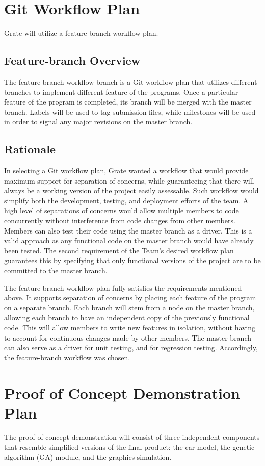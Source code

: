 \documentclass{article}
\begin{document}
\section{Git Workflow Plan}
Grate will utilize a feature-branch workflow plan. 

\subsection{Feature-branch Overview}
The feature-branch workflow branch is a Git workflow plan that utilizes 
different branches to implement different feature of the programs. Once a 
particular feature of the program is completed, its branch will be merged with 
the master branch. Labels will be used to tag submission files, while milestones 
will be used in order to signal any major revisions on the master branch.

\subsection{Rationale}
In selecting a Git workflow plan, Grate wanted a workflow that would provide 
maximum support for separation of concerns, while guaranteeing that there will 
always be a working version of the project easily assessable. Such workflow 
would simplify both the development, testing, and deployment efforts of the 
team. A high level of separations of concerns would allow multiple members to 
code concurrently without interference from code changes from other members. 
Members can also test their code using the master branch as a driver. This is a 
valid approach as any functional code on the master branch would have already 
been tested. The second requirement of the Team's desired workflow plan 
guarantees this by specifying that only functional versions of the project are 
to be committed to the master branch. 

The feature-branch workflow plan fully satisfies the requirements mentioned 
above. It supports separation of concerns by placing each feature of the program 
on a separate branch. Each branch will stem from a node on the master branch, 
allowing each branch to have an independent copy of the previously functional 
code. This will allow members to write new features in isolation, without having 
to account for continuous changes made by other members. The master branch can 
also serve as a driver for unit testing, and for regression testing. 
Accordingly, the feature-branch workflow was chosen.

\section{Proof of Concept Demonstration Plan}
The proof of concept demonstration will consist of three independent components 
that resemble simplified versions of the final product: the car model, the 
genetic algorithm (GA) module, and the graphics simulation. 
\end{document}
